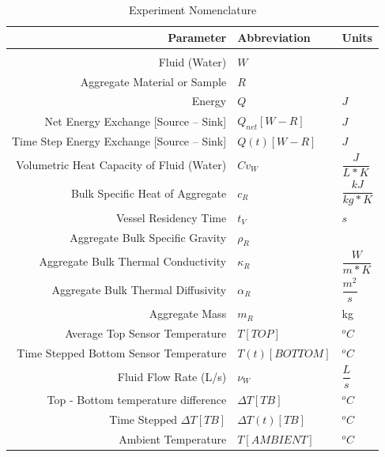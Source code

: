 \begin{table}[t]
\begin{large}\caption{Experiment Nomenclature}\end{large}
\label{simNom}
\centering
\begin{tabular}{r l l}
Parameter & Abbreviation & Units\\
\hline
\\[-.5ex]
Fluid (Water)					&	$W$\\[3mm]

Aggregate Material or Sample			& 	$R$\\[3mm]

Energy						&	$Q$			& $J$\\[3mm]

Net Energy Exchange [Source -- Sink]		&	$Q_{net}[W-R]$		& $J$\\[3mm]

Time Step Energy Exchange [Source -- Sink]	&	$Q(t)[W-R]$		& $J$\\[3mm]

Volumetric Heat Capacity of Fluid (Water)	&	$Cv_{W}$		& $\dfrac{J}{L*K}$\\[3mm]

Bulk Specific Heat of Aggregate			&	$c_{R}$			& $\dfrac{kJ}{kg*K}$\\[3mm]

Vessel Residency Time 				&	$t_{V}$			& $s$\\[3mm]

Aggregate Bulk Specific Gravity			&	$\rho_{R}$		&\\[3mm]

Aggregate Bulk Thermal Conductivity		&	$\kappa_{R}$		& $\dfrac{W}{m*K}$\\[3mm]

Aggregate Bulk Thermal Diffusivity		&	$\alpha_{R}$		& $\dfrac{m^{2}}{s}$\\[3mm]

Aggregate Mass					&	$m_{R}$			& kg\\[3mm]

Average Top Sensor Temperature 			&	$T[TOP]$		& $^{o}C$\\[3mm]

Time Stepped Bottom Sensor Temperature 		&	$T(t)[BOTTOM]$		& $^{o}C$\\[3mm]	

Fluid Flow Rate (L/s)				&	$\nu_{W}$		& $\dfrac{L}{s}$\\[3mm]

Top - Bottom temperature difference 		&	$\Delta T[TB]$		& $^{o}C$\\[3mm]

Time Stepped $\Delta T[TB]$ 			&	$\Delta T(t)[TB]$	& $^{o}C$\\[3mm]

Ambient Temperature				&	$T[AMBIENT]$		& $^{o}C$\\[3mm]

\hline
\end{tabular}
\end{table} 


